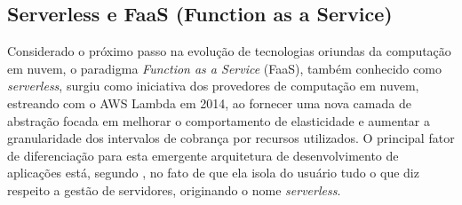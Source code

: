 \documentclass[english,brazilian]{UNISINOSmonografia} %
\begin{document}







\subsection{Serverless e FaaS (Function as a Service)}\label{sec:faas}



Considerado o próximo passo na evolução de tecnologias oriundas da computação em nuvem, o paradigma \textit{Function as a Service} (FaaS), também conhecido como \textit{serverless}, surgiu como iniciativa dos provedores de computação em nuvem, estreando com o AWS Lambda em 2014, ao fornecer uma nova camada de abstração focada em melhorar o comportamento de elasticidade e aumentar a granularidade dos intervalos de cobrança por recursos utilizados.
O principal fator de diferenciação para esta emergente arquitetura de desenvolvimento de aplicações está, segundo , no fato de que ela isola do usuário tudo o que diz respeito a gestão de servidores, originando o nome \textit{serverless}.
\end{document}
